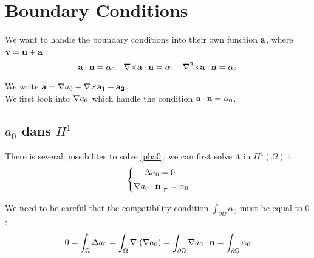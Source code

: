 \section{Boundary Conditions}
\label{relev}
We want to handle the boundary conditions into their own function ${\mathbf{a}}$, where ${\mathbf{v}}={\mathbf{u}}+{\mathbf{a}}$ :
\[ {\mathbf{a}}\cdot{\mathbf{n}}=\alpha_0\quad {\nabla\times}{\mathbf{a}}\cdot{\mathbf{n}}=\alpha_1 \quad {\nabla^2\times}{\mathbf{a}}\cdot{\mathbf{n}}=\alpha_2 \]

We write ${\mathbf{a}}={\nabla} a_0 + {\nabla\times}{\mathbf{a}}_1 + {\mathbf{a_2}}$.\\
We first look into ${\nabla} a_0$ which handle the condition ${\mathbf{a}}\cdot{\mathbf{n}}=\alpha_0$.\\

\subsection{$a_0$ dans $H^1$}
\label{seca0hdiv}
There is several possibilites to solve \ref{pba0}, we can first solve it in $H^1(\Omega)$ :
\begin{equation*}
  \left\{
  \begin{aligned}
    &-{\Delta} a_0 = 0\\
    &{\nabla} a_0\cdot {\mathbf{n}}{\big\rvert_{\Gamma}}=\alpha_0
  \end{aligned}
  \right.
\end{equation*}

We need to be careful that the compatibility condition $\int_{\partial\Omega} \alpha_0$ must be equal to 0 :
\[ 0=\int_\Omega {\Delta} a_0 = \int_\Omega {\nabla\cdot}({\nabla} a_0) = \int_{\partial\Omega} {\nabla} a_0\cdot {\mathbf{n}} = \int_{\partial\Omega} \alpha_0 \]

